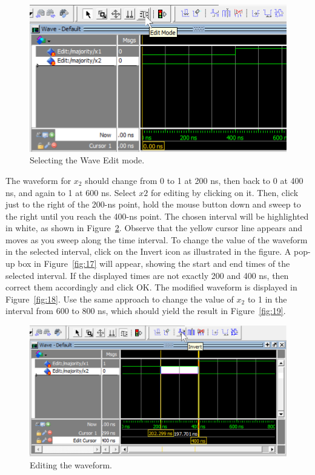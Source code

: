 \documentclass[11pt, twoside, pdftex]{article}
\begin{document}
\begin{figure}[H]
   \begin{center}
      \includegraphics[scale=0.75]{figures/edit_mode.png}
   \caption{Selecting the Wave Edit mode.} 
	 \label{fig:15}
	 \end{center}
\end{figure}

The waveform for $x_2$ should change from 0 to 1 at 200 ns, then back to 0 at 400 ns, 
and again to 1 at 600 ns. Select $x2$ for editing by clicking on it. Then, click just to the 
right of the 200-ns point, hold the mouse button down and sweep to the right until 
you reach the 400-ns point. The chosen interval will be highlighted in white, as shown in 
Figure~\ref{fig:16}.  Observe that the yellow cursor line appears and moves as you sweep
along the time interval.  To change the value of the waveform in the selected interval, click on the 
{\sf Invert} icon as illustrated in the figure. A pop-up box in Figure~\ref{fig:17} will 
appear, showing the start and end times of the selected interval. If the displayed times are 
not exactly 200 and 400 ns, then correct them accordingly and click {\sf OK}. The modified 
waveform is displayed in Figure~\ref{fig:18}.  Use the same approach to change the value 
of $x_2$ to 1 in the interval from 600 to 800 ns, which should yield the result in 
Figure~\ref{fig:19}.

\begin{figure}[H]
   \begin{center}
      \includegraphics[scale=.75]{figures/figure16.png}
   \caption{Editing the waveform.} 
	 \label{fig:16}
	 \end{center}
\end{figure}
\end{document}
